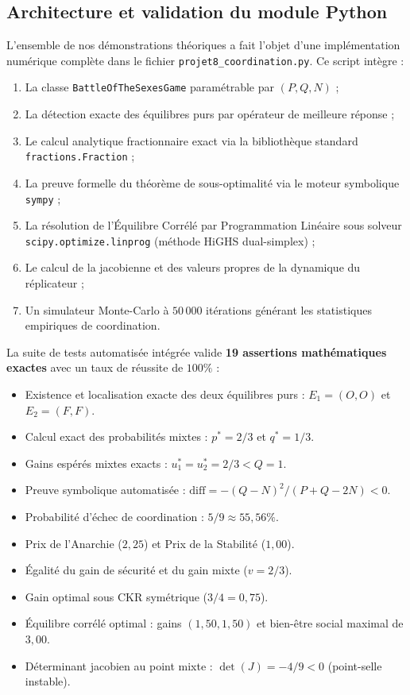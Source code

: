\documentclass[11pt,a4paper]{article}
\begin{document}
\subsection{Architecture et validation du module Python}
L'ensemble de nos démonstrations théoriques a fait l'objet d'une implémentation numérique complète dans le fichier \texttt{projet8\_coordination.py}. Ce script intègre :
\begin{enumerate}[label=(\arabic*),leftmargin=1.5em]
    \item La classe \texttt{BattleOfTheSexesGame} paramétrable par $(P, Q, N)$ ;
    \item La détection exacte des équilibres purs par opérateur de meilleure réponse ;
    \item Le calcul analytique fractionnaire exact via la bibliothèque standard \texttt{fractions.Fraction} ;
    \item La preuve formelle du théorème de sous-optimalité via le moteur symbolique \texttt{sympy} ;
    \item La résolution de l'Équilibre Corrélé par Programmation Linéaire sous solveur \texttt{scipy.optimize}\allowbreak\texttt{.linprog} (méthode HiGHS dual-simplex) ;
    \item Le calcul de la jacobienne et des valeurs propres de la dynamique du réplicateur ;
    \item Un simulateur Monte-Carlo à $50\,000$ itérations générant les statistiques empiriques de coordination.
\end{enumerate}

\begin{verifbox}
La suite de tests automatisée intégrée valide \textbf{19 assertions mathématiques exactes} avec un taux de réussite de $100\%$ :
\begin{itemize}[leftmargin=1.5em]
    \item Existence et localisation exacte des deux équilibres purs : $E_1=(O, O)$ et $E_2=(F, F)$.
    \item Calcul exact des probabilités mixtes : $p^* = 2/3$ et $q^* = 1/3$.
    \item Gains espérés mixtes exacts : $u_1^* = u_2^* = 2/3 < Q = 1$.
    \item Preuve symbolique automatisée : $\text{diff} = -(Q - N)^2 / (P + Q - 2N) < 0$.
    \item Probabilité d'échec de coordination : $5/9 \approx 55{,}56\%$.
    \item Prix de l'Anarchie ($2{,}25$) et Prix de la Stabilité ($1{,}00$).
    \item Égalité du gain de sécurité et du gain mixte ($v = 2/3$).
    \item Gain optimal sous CKR symétrique ($3/4 = 0{,}75$).
    \item Équilibre corrélé optimal : gains $(1{,}50, 1{,}50)$ et bien-être social maximal de $3{,}00$.
    \item Déterminant jacobien au point mixte : $\det(J) = -4/9 < 0$ (point-selle instable).
\end{itemize}
\end{verifbox}
\end{document}
